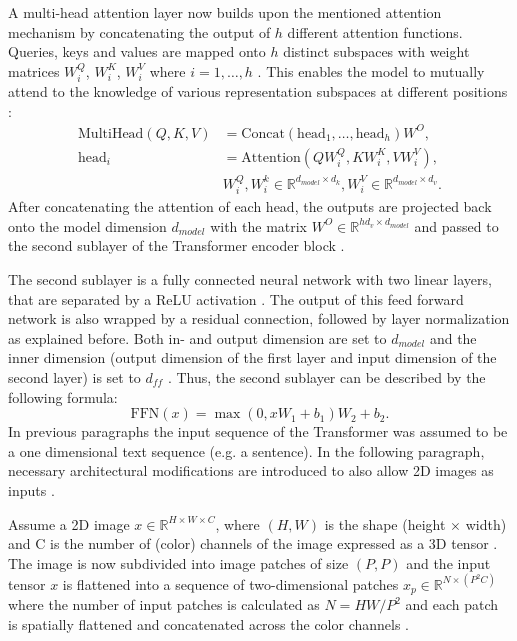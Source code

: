 A multi-head attention layer now builds upon the mentioned attention mechanism by concatenating the output of $h$ different attention functions.
Queries, keys and values are mapped onto $h$ distinct subspaces with weight matrices $W_i^Q$, $W_i^K$, $W_i^V$ where $i=1,\dots,h$ \citep{Vaswani2017}.
This enables the model to mutually attend to the knowledge of various representation subspaces at different positions \citep{Vaswani2017}:
\begin{align}
	\text{MultiHead}(Q,K,V) &= \text{Concat}(\text{head}_1,\dots,\text{head}_h)W^O, \\
	\text{head}_i & = \text{Attention}(QW_i^Q,KW_i^K,VW_i^V), \\
	& W_{i}^{Q}, W_{i}^{k} \in \mathbb{R}^{d_{model}\times d_k} , W_i^V \in \mathbb{R}^{d_{model} \times d_v}.	
\end{align}
After concatenating the attention of each head, the outputs are projected back onto the model dimension $d_{model}$ with the matrix $W^O \in \mathbb{R}^{hd_v \times d_{model}}$ and passed to the second sublayer of the Transformer encoder block \citep{Vaswani2017}.
\par
The second sublayer is a fully connected neural network with two linear layers, that are separated by a ReLU activation \citep{Vaswani2017}.
The output of this feed forward network is also wrapped by a residual connection, followed by layer normalization as explained before.
Both in- and output dimension are set to $d_{model}$ and the inner dimension (output dimension of the first layer and input dimension of the second layer) is set to $d_{ff}$ \citep{Vaswani2017}.
Thus, the second sublayer can be described by the following formula:
\begin{equation}
	\text{FFN}(x) = \max(0, xW_1 + b_1)W_2+b_2. 
	\label{equation:FFN}
\end{equation}
In previous paragraphs the input sequence of the Transformer was assumed to be a one dimensional text sequence (e.g. a sentence).
In the following paragraph, necessary architectural modifications are introduced to also allow 2D images as inputs \citep{Dosovitskiy2020}.
\par
Assume a 2D image $x\in \mathbb{R}^{H\times W \times C }$, where $(H, W)$ is the shape (height $\times$ width) and C is the number of (color) channels of the image expressed as a 3D tensor \citep{Dosovitskiy2020}.
The image is now subdivided into image patches of size $(P, P)$ and the input tensor $x$ is flattened into a sequence of two-dimensional patches $x_p \in \mathbb{R}^{N \times (P^2C)}$ where the number of input patches is calculated as $N = HW/P^2$ and each patch is spatially flattened and concatenated across the color channels \citep{Dosovitskiy2020}.
